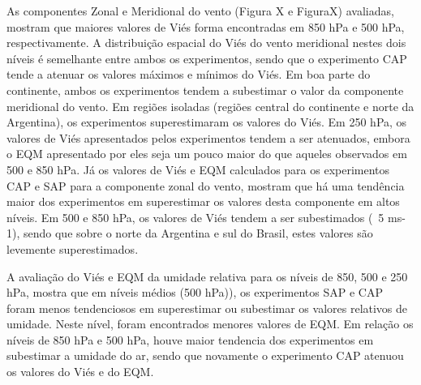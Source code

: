 As componentes Zonal e Meridional do vento (Figura  X e FiguraX) avaliadas, mostram que maiores valores de Viés forma encontradas em 850 hPa e 500 hPa, respectivamente. A distribuição espacial do Viés do vento meridional nestes dois níveis é semelhante entre ambos os experimentos, sendo que o experimento CAP tende a atenuar os valores máximos e mínimos do Viés. Em boa parte do continente, ambos os experimentos tendem a subestimar o valor da componente meridional do vento. Em regiões isoladas (regiões central do continente e norte da Argentina), os experimentos superestimaram os valores do Viés. Em 250 hPa, os valores de Viés apresentados pelos experimentos tendem a ser atenuados, embora o EQM apresentado por eles seja um pouco maior do que aqueles observados em 500 e 850 hPa. Já os valores de Viés e EQM calculados para os experimentos CAP e SAP para a componente zonal do vento, mostram que há uma tendência maior dos experimentos em superestimar os valores desta componente em altos níveis. Em 500 e 850 hPa, os valores de Viés tendem a ser subestimados (~5 ms-1), sendo que sobre o norte da Argentina e sul do Brasil, estes valores são levemente superestimados.

A avaliação do Viés e EQM da umidade relativa para os níveis de 850, 500 e 250 hPa, mostra que em níveis médios (500 hPa)), os experimentos SAP e CAP foram menos tendenciosos em superestimar ou subestimar os valores relativos de umidade. Neste nível, foram encontrados menores valores de EQM. Em relação os níveis de 850 hPa e 500 hPa, houve maior tendencia dos experimentos em subestimar a umidade do ar, sendo que novamente o experimento CAP atenuou os valores do Viés e do EQM.


